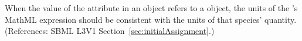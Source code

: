 When the value of the attribute  in an \InitialAssignment
object refers to a \Species object, the units of the \InitialAssignment's
MathML  expression should be consistent with the units of that
species' quantity.  (References: SBML L3V1
Section~\ref{sec:initialAssignment}.)
